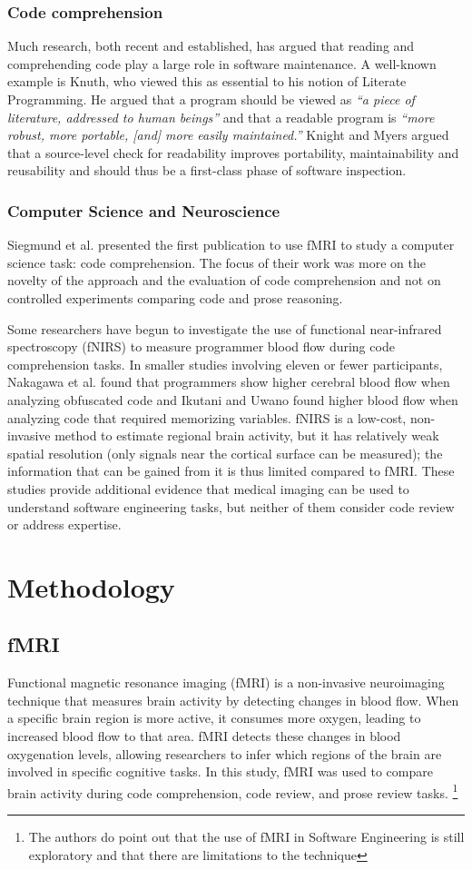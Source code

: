 \subsubsection{Code comprehension}
Much research, both recent and established, has argued that reading and comprehending code play a large role in software maintenance. A well-known example is Knuth, who viewed this as essential to his notion of Literate Programming. He argued that a program should be viewed as \textit{“a piece of literature, addressed to human beings”} and that a readable program is \textit{“more robust, more portable, [and] more easily maintained.”} Knight and Myers argued that a source-level check for readability improves portability, maintainability and reusability and should thus be a first-class phase of software inspection.

\subsubsection{Computer Science and Neuroscience}
Siegmund et al. presented the first publication to use fMRI to study a computer science task: code comprehension. The focus of their work was more on the novelty of the approach and the evaluation of code comprehension and not on controlled experiments comparing code and prose reasoning.

Some researchers have begun to investigate the use of functional near-infrared spectroscopy (fNIRS) to measure programmer blood flow during code comprehension tasks. In smaller studies involving eleven or fewer participants, Nakagawa et al. found that programmers show higher cerebral blood flow when analyzing obfuscated code and Ikutani and Uwano found higher blood flow when analyzing code that required memorizing variables. fNIRS is a low-cost, non-invasive method to estimate regional brain activity, but it has relatively weak spatial resolution (only signals near the cortical surface can be measured); the information that can be gained from it is thus limited compared to fMRI. These studies provide additional evidence that medical imaging can be used to understand software engineering tasks, but neither of them consider code review or address expertise.

\section{Methodology}
\subsection{fMRI}
Functional magnetic resonance imaging (fMRI) is a non-invasive neuroimaging technique that measures brain activity by detecting changes in blood flow. When a specific brain region is more active, it consumes more oxygen, leading to increased blood flow to that area. fMRI detects these changes in blood oxygenation levels, allowing researchers to infer which regions of the brain are involved in specific cognitive tasks. In this study, fMRI was used to compare brain activity during code comprehension, code review, and prose review tasks. \footnote{The authors do point out that the use of fMRI in Software Engineering is still exploratory and that there are limitations to the technique}

